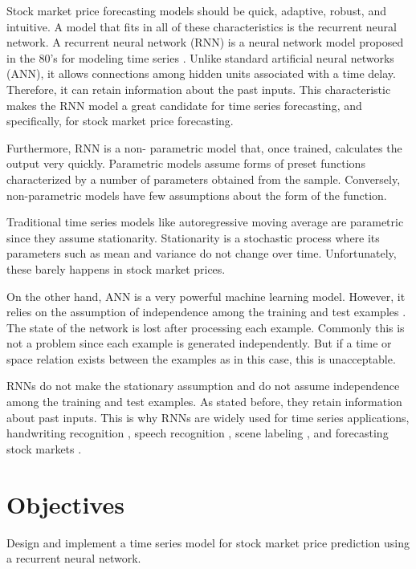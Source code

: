 Stock market price forecasting models should be quick, adaptive, robust, and intuitive. A model that fits in all of these characteristics is the recurrent neural network. A recurrent neural network (RNN) is a neural network model proposed in the 80's for modeling time series \cite{pascanu2013difficulty}. Unlike standard artificial neural networks (ANN), it allows connections among hidden units associated with a time delay. Therefore, it can retain information about the past inputs. This characteristic makes the RNN model a great candidate for time series forecasting, and specifically, for stock market price forecasting.

Furthermore, RNN is a non- parametric model that, once trained, calculates the output very quickly. Parametric models assume forms of preset functions characterized by a number of parameters obtained from the sample. Conversely, non-parametric models have few assumptions about the form of the function.  

Traditional time series models like autoregressive moving average are parametric since they assume stationarity. Stationarity is a stochastic process where its parameters such as mean and variance do not change over time. Unfortunately, these barely happens in stock market prices. 

On the other hand, ANN is a very powerful machine learning model. However, it relies on the assumption of independence among the training and test examples \cite{lipton2015critical}. The state of the network is lost after processing each example. Commonly this is not a problem since each example is generated independently. But if a time or space relation exists between the examples as in this case, this is unacceptable.

RNNs do not make the stationary assumption and do not assume independence among the training and test examples. As stated before, they retain information about past inputs. This is why RNNs are widely used for time series applications, handwriting recognition \cite{graves2009offline}, speech recognition \cite{graves2013generating}, scene labeling \cite{pinheiro2014recurrent}, and forecasting stock markets \cite{hsieh2011forecasting}. 

\section{Objectives}
Design and implement a time series model for stock market price prediction using a recurrent neural network.

